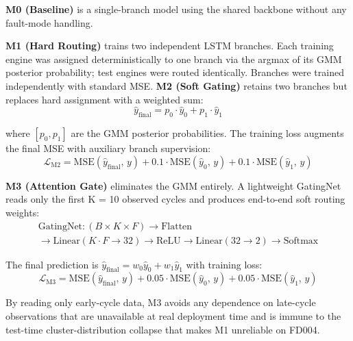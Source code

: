 \documentclass[preprint,10pt]{elsarticle}
\begin{document}
\textbf{M0 (Baseline)} is a single-branch model using the shared backbone without any fault-mode handling.

\textbf{M1 (Hard Routing)} trains two independent LSTM branches. Each training engine was assigned deterministically to one branch via the argmax of its GMM posterior probability; test engines were routed identically. Branches were trained independently with standard MSE. \textbf{M2 (Soft Gating)} retains two branches but replaces hard assignment with a weighted sum:
\begin{equation}
\hat{y}_{\text{final}} = p_0 \cdot \hat{y}_0 + p_1 \cdot \hat{y}_1
\end{equation}

where $[p_0, p_1]$ are the GMM posterior probabilities. The training loss augments the final MSE with auxiliary branch supervision:
\begin{equation}
\mathcal{L}_{\text{M2}} = \text{MSE}(\hat{y}_{\text{final}},\, y) + 0.1\cdot\text{MSE}(\hat{y}_0,\, y) + 0.1\cdot\text{MSE}(\hat{y}_1,\, y)
\end{equation}

\textbf{M3 (Attention Gate)} eliminates the GMM entirely. A lightweight GatingNet reads only the first K = 10 observed cycles and produces end-to-end soft routing weights:
\begin{multline}
\text{GatingNet}: (B \times K \times F) \to \text{Flatten} \\
\to \text{Linear}(K{\cdot}F \to 32) \to \text{ReLU} \to \text{Linear}(32 \to 2) \to \text{Softmax}
\end{multline}

The final prediction is $\hat{y}_{\text{final}} = w_0\hat{y}_0 + w_1\hat{y}_1$ with training loss:
\begin{equation}
\mathcal{L}_{\text{M3}} = \text{MSE}(\hat{y}_{\text{final}},\, y) + 0.05\cdot\text{MSE}(\hat{y}_0,\, y) + 0.05\cdot\text{MSE}(\hat{y}_1,\, y)
\end{equation}

By reading only early-cycle data, M3 avoids any dependence on late-cycle observations that are unavailable at real deployment time and is immune to the test-time cluster-distribution collapse that makes M1 unreliable on FD004.

\end{document}
